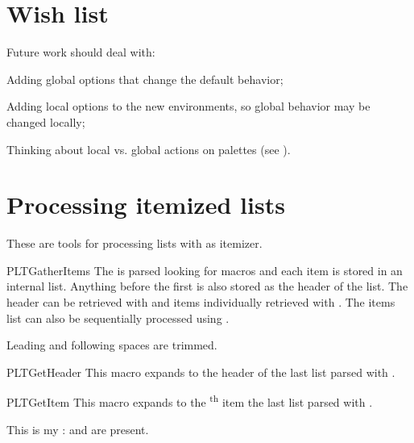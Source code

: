 \documentclass[a4paper, 11pt]{article}
\begin{document}
\section{Wish list}

Future work should deal with:
\begin{itemizeitemize}
    \item Adding global options that change the default behavior;
    \item Adding local options to the new environments, so global behavior may be changed locally;
    \item Thinking about local vs. global actions on palettes (see ).
\end{itemizeitemize}

\clearpage
\appendix


\section{Processing itemized lists}\label{sec:getitems}
These are tools for processing lists with  as itemizer.

\begin{macrodef}{PLTGatherItems}{}
    The  is parsed looking for  macros and each item is stored in an internal list. Anything before the first  is also stored as the header of the list. The header can be retrieved with  and items individually retrieved with . The items list can also be sequentially processed using .

    Leading and following spaces are trimmed.
\end{macrodef}

\begin{macrodef}{PLTGetHeader}{}
    This macro expands to the header of the last list parsed with .
\end{macrodef}

\begin{macrodef}{PLTGetItem}{}
    This macro expands to the \textsuperscript{th} item the last list parsed with .
\end{macrodef}

\begin{example}{}

    This is my \PLTGetHeader:  and  are present.
\end{example}
\end{document}
